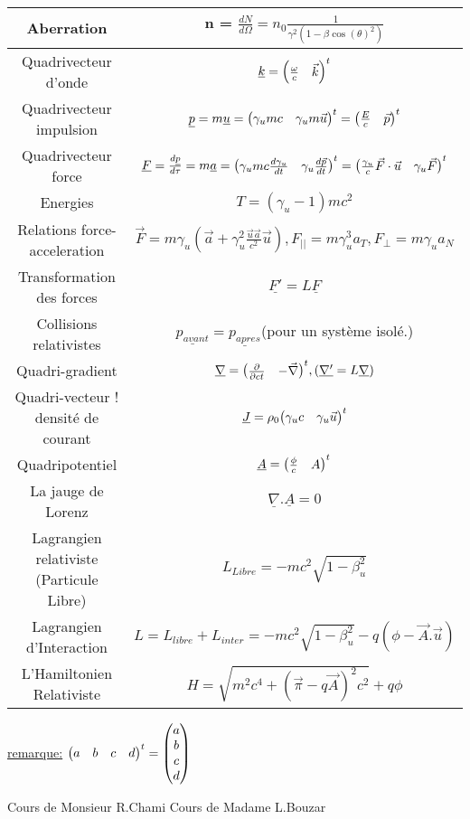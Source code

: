 \documentclass[french]{article}
\begin{document}
\begin{center}
\begin{tabular}{| c | c |}
\hline
Aberration&n = $\frac{dN}{d\Omega}= n_0\frac{1}{\gamma^2\left(1-\beta\cos(\theta)^2\right)}$\\
\hline
Quadrivecteur d’onde&$\underline{k}= \mqty(\frac{\omega}{c} &\vec{k})^t$\\
\hline
Quadrivecteur impulsion&$\underline{p}=m \underline{u}=\mqty(\gamma_u mc & \gamma_u m\vec{u})^t=\mqty(\frac{E}{c}&\vec{p})^t$\\
\hline
Quadrivecteur force&$\underline{F}=\frac{d\underline{p}}{d\tau}= m \underline{a}= \mqty(\gamma_umc\frac{d \gamma_u}{dt}&\gamma_u \frac{d\vec{p}}{dt})^t =\mqty(\frac{\gamma_u}{c}\vec{F}\cdot\vec{u}&\gamma_u\vec{F})^t$\\
\hline
Energies&$T = \left(\gamma_u-1\right)mc^2$\\
\hline
Relations force-acceleration&$\vec{F}=m\gamma_u\left(\vec{a}+\gamma_u^2\frac{\vec{u}\vec{a}}{c^2}\vec{u}\right), F_{||}=m\gamma_u^3a_T, F_{\perp}= m\gamma_ua_N$\\
\hline
Transformation des forces&$\underline{F'}= L\underline{F}$\\
\hline
Collisions relativistes&$\underline{p_{avant}} = \underline{p_{apres}}$(pour
un système isolé.)\\
\hline
Quadri-gradient&$\underline{\nabla}=\mqty(\pdv{ct}&-\vec{\nabla})^t, (\underline{\nabla'}=L\underline{\nabla})$\\
\hline
Quadri-vecteur ! densité de courant&$\underline{J}= \rho_0\mqty(\gamma_uc&\gamma_u\vec{u})^t$\\
\hline
Quadripotentiel&$\underline{A}=\mqty(\frac{\phi}{c}& A)^t$\\
\hline
La jauge de Lorenz&$\underline{\nabla}.\underline{A}=0$\\
\hline
Lagrangien relativiste (Particule Libre)&$L_{Libre}= -mc^2\sqrt{1-\beta_u^2}$\\
\hline
Lagrangien d’Interaction&$L = L_{libre}+L_{inter}=-mc^2\sqrt{1-\beta_u^2}-q\left(\phi-\vec{A}.\vec{u}\right)$\\
\hline
L’Hamiltonien Relativiste&$H = \sqrt{m^2c^4+\left(\vec{\pi}-q\vec{A}\right)^2c^2}+q\phi$
\\
\hline



		
			
			
			
		\end{tabular}
	\end{center}
\underline{remarque:} $\mqty(a&b&c&d)^t= \mqty(a\\b\\c\\d)$ 
\begin{thebibliography}{9}
	Cours de Monsieur R.Chami
	Cours de Madame L.Bouzar
\end{thebibliography}
\end{document}
